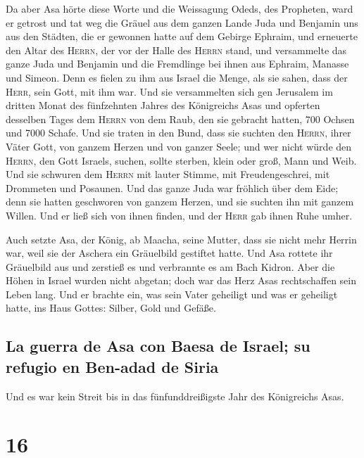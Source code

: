  Da aber Asa hörte diese Worte und die Weissagung Odeds,
des Propheten, ward er getrost und tat weg die Gräuel aus dem ganzen
Lande Juda und Benjamin uns aus den Städten, die er gewonnen hatte auf
dem Gebirge Ephraim, und erneuerte den Altar des \textsc{Herrn}, der vor
der Halle des \textsc{Herrn} stand,  und versammelte das
ganze Juda und Benjamin und die Fremdlinge bei ihnen aus Ephraim,
Manasse und Simeon. Denn es fielen zu ihm aus Israel die Menge, als sie
sahen, dass der \textsc{Herr}, sein Gott, mit ihm war. 
Und sie versammelten sich gen Jerusalem im dritten Monat des fünfzehnten
Jahres des Königreichs Asas  und opferten desselben Tages
dem \textsc{Herrn} von dem Raub, den sie gebracht hatten, 700 Ochsen und
7000 Schafe.  Und sie traten in den Bund, dass sie
suchten den \textsc{Herrn}, ihrer Väter Gott, von ganzem Herzen und von
ganzer Seele;  und wer nicht würde den \textsc{Herrn},
den Gott Israels, suchen, sollte sterben, klein oder groß, Mann und
Weib.  Und sie schwuren dem \textsc{Herrn} mit lauter
Stimme, mit Freudengeschrei, mit Drommeten und Posaunen. 
Und das ganze Juda war fröhlich über dem Eide; denn sie hatten
geschworen von ganzem Herzen, und sie suchten ihn mit ganzem Willen. Und
er ließ sich von ihnen finden, und der \textsc{Herr} gab ihnen Ruhe
umher.

 Auch setzte Asa, der König, ab Maacha, seine Mutter,
dass sie nicht mehr Herrin war, weil sie der Aschera ein Gräuelbild
gestiftet hatte. Und Asa rottete ihr Gräuelbild aus und zerstieß es und
verbrannte es am Bach Kidron.  Aber die Höhen in Israel
wurden nicht abgetan; doch war das Herz Asas rechtschaffen sein Leben
lang.  Und er brachte ein, was sein Vater geheiligt und
was er geheiligt hatte, ins Haus Gottes: Silber, Gold und Gefäße.

\hypertarget{la-guerra-de-asa-con-baesa-de-israel-su-refugio-en-ben-adad-de-siria}{%
\subsection{La guerra de Asa con Baesa de Israel; su refugio en Ben-adad
de
Siria}\label{la-guerra-de-asa-con-baesa-de-israel-su-refugio-en-ben-adad-de-siria}}

 Und es war kein Streit bis in das fünfunddreißigste Jahr
des Königreichs Asas.

\hypertarget{section-15}{%
\section{16}\label{section-15}}

